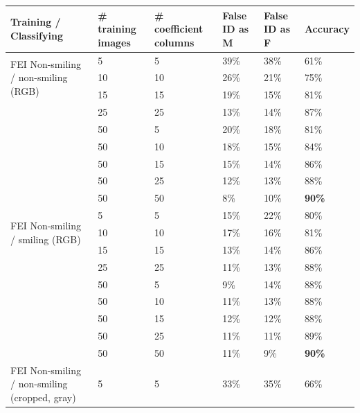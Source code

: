 \documentclass[hidelinks,11pt]{article}
\begin{document}
\begin{appendices}
  \begin{longtable}{p{6em} p{5em} p{6em} p{6em} p{6em} p{6em}}
      \toprule
      Training / Classifying & \# training images  & \# coefficient columns  & False ID as M & False
      ID as F & Accuracy \\
      \midrule
      \midrule
      \multirow{3}{6em}{FEI Non-smiling / non-smiling (RGB)} 
                                & 5   & 5   & 39\%  & 38\%  & 61\% \\
                                & 10  & 10  & 26\%  & 21\%  & 75\% \\
                                & 15  & 15  & 19\%  & 15\%  & 81\% \\
                                & 25  & 25  & 13\%  & 14\%  & 87\% \\
                                & 50  & 5   & 20\%  & 18\%  & 81\% \\
                                & 50  & 10  & 18\%  & 15\%  & 84\% \\
                                & 50  & 15  & 15\%  & 14\%  & 86\% \\
                                & 50  & 25  & 12\%  & 13\%  & 88\% \\
                                & 50  & 50  & 8\%   & 10\%  & \bfseries 90\% \\
      \midrule
      \multirow{3}{6em}{FEI Non-smiling / smiling (RGB)} 
                                & 5   & 5   & 15\%  & 22\%  & 80\% \\
                                & 10  & 10  & 17\%  & 16\%  & 81\% \\
                                & 15  & 15  & 13\%  & 14\%  & 86\% \\
                                & 25  & 25  & 11\%  & 13\%  & 88\% \\
                                & 50  & 5   & 9\%   & 14\%  & 88\% \\
                                & 50  & 10  & 11\%  & 13\%  & 88\% \\
                                & 50  & 15  & 12\%  & 12\%  & 88\% \\
                                & 50  & 25  & 11\%  & 11\%  & 89\% \\
                                & 50  & 50  & 11\%  & 9\%   & \bfseries 90\% \\
      \midrule
      \multirow{3}{6em}{FEI Non-smiling / non-smiling (cropped, gray)} 
                                & 5   & 5   & 33\%  & 35\%  & 66\% \\

\end{longtable}
\end{appendices}
\end{document}
